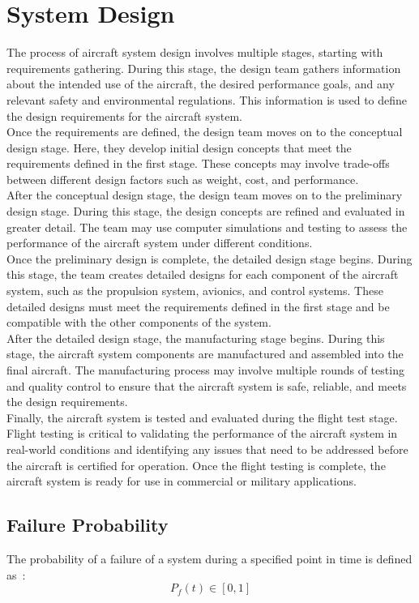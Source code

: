 \section{System Design}\label{sec:system-design}
The process of aircraft system design involves multiple stages, starting with requirements gathering.
During this stage, the design team gathers information about the intended use of the aircraft, the desired performance goals, and any relevant safety and environmental regulations.
This information is used to define the design requirements for the aircraft system.
\\
Once the requirements are defined, the design team moves on to the conceptual design stage.
Here, they develop initial design concepts that meet the requirements defined in the first stage.
These concepts may involve trade-offs between different design factors such as weight, cost, and performance.
\\
After the conceptual design stage, the design team moves on to the preliminary design stage.
During this stage, the design concepts are refined and evaluated in greater detail.
The team may use computer simulations and testing to assess the performance of the aircraft system under different conditions.
\\
Once the preliminary design is complete, the detailed design stage begins.
During this stage, the team creates detailed designs for each component of the aircraft system, such as the propulsion system, avionics, and control systems.
These detailed designs must meet the requirements defined in the first stage and be compatible with the other components of the system.
\\
After the detailed design stage, the manufacturing stage begins.
During this stage, the aircraft system components are manufactured and assembled into the final aircraft.
The manufacturing process may involve multiple rounds of testing and quality control to ensure that the aircraft system is safe, reliable, and meets the design requirements.
\\
Finally, the aircraft system is tested and evaluated during the flight test stage.
Flight testing is critical to validating the performance of the aircraft system in real-world conditions and identifying any issues that need to be addressed before the aircraft is certified for operation.
Once the flight testing is complete, the aircraft system is ready for use in commercial or military applications.
\subsection{Failure Probability}\label{subsec:failure-probability}
The probability of a failure of a system during a specified point in time is defined as~\cite{lfs2}:
\begin{equation}
    \label{eq:failure-probability}
    P_f(t) \in [0,1]
\end{equation}
